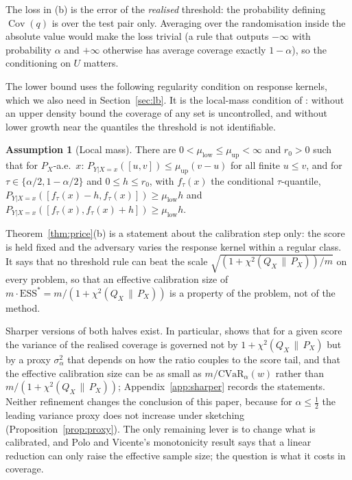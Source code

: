\documentclass[11pt,a4paper]{article}
\newcommand{\PX}{P_X}
\newcommand{\QX}{Q_X}
\newcommand{\chisq}{\chi^2(\QX\,\|\,\PX)}
\newcommand{\Cov}{\operatorname{Cov}}
\theoremstyle{plain}
\theoremstyle{definition}
\newtheorem{assumption}{Assumption}
\theoremstyle{remark}
\begin{document}
The loss in (b) is the error of the \emph{realised} threshold: the probability defining $\Cov(q)$ is over the test pair only. Averaging over the randomisation inside the absolute value would make the loss trivial (a rule that outputs $-\infty$ with probability $\alpha$ and $+\infty$ otherwise has average coverage exactly $1-\alpha$), so the conditioning on $U$ matters.

The lower bound uses the following regularity condition on response kernels, which we also need in Section~\ref{sec:lb}. It is the local-mass condition of \cite{isaev2026}: without an upper density bound the coverage of any set is uncontrolled, and without lower growth near the quantiles the threshold is not identifiable.

\begin{assumption}[Local mass]\label{ass:A1}
There are $0<\mu_{\mathrm{low}}\le\mu_{\mathrm{up}}<\infty$ and $r_0>0$ such that for $\PX$-a.e.\ $x$: $P_{Y|X=x}([u,v])\le\mu_{\mathrm{up}}(v-u)$ for all finite $u\le v$, and for $\tau\in\{\alpha/2,1-\alpha/2\}$ and $0\le h\le r_0$, with $f_\tau(x)$ the conditional $\tau$-quantile,
$P_{Y|X=x}([f_\tau(x)-h,f_\tau(x)])\ge\mu_{\mathrm{low}}h$ and $P_{Y|X=x}([f_\tau(x),f_\tau(x)+h])\ge\mu_{\mathrm{low}}h$.
\end{assumption}

Theorem~\ref{thm:price}(b) is a statement about the calibration step only: the score is held fixed and the adversary varies the response kernel within a regular class. It says that no threshold rule can beat the scale $\sqrt{(1+\chisq)/m}$ on every problem, so that an effective calibration size of $m\cdot\mathrm{ESS}^\ast=m/(1+\chisq)$ is a property of the problem, not of the method.

Sharper versions of both halves exist. In particular, \cite{pournaderi2026} shows that for a given score the variance of the realised coverage is governed not by $1+\chisq$ but by a proxy $\sigma_\alpha^2$ that depends on how the ratio couples to the score tail, and that the effective calibration size can be as small as $m/\mathrm{CVaR}_\alpha(w)$ rather than $m/(1+\chisq)$; Appendix~\ref{app:sharper} records the statements. Neither refinement changes the conclusion of this paper, because for $\alpha\le\tfrac12$ the leading variance proxy does not increase under sketching (Proposition~\ref{prop:proxy}). The only remaining lever is to change what is calibrated, and Polo and Vicente's monotonicity result \cite{polo2022} says that a linear reduction can only raise the effective sample size; the question is what it costs in coverage.
\end{document}
